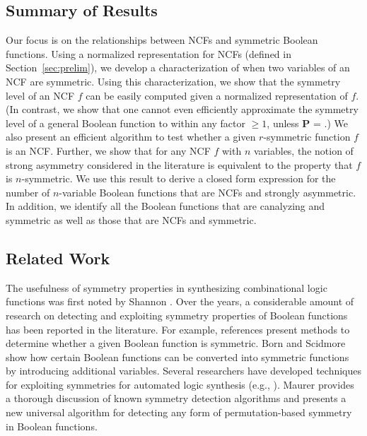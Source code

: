 
\subsection{Summary of Results}
\label{sse:contrib}

Our focus is on the relationships between 
NCFs and symmetric Boolean functions.
Using a normalized representation for NCFs 
(defined in Section~\ref{sec:prelim}), we develop a
characterization of when two variables of an NCF are symmetric.
Using this characterization, we show
that the symmetry level of an NCF $f$
can be easily computed given a normalized representation of $f$.
(In contrast, we show that 
one cannot even efficiently approximate the symmetry level of
a general Boolean function to within any factor $\geq 1$, 
unless \textbf{P} = \cnp.)
We also present an efficient algorithm to test whether a given
$r$-symmetric function $f$ is an NCF. 
Further, we show that for any NCF $f$ with $n$ variables, the notion of
strong asymmetry considered in the literature is equivalent to
the property that $f$ is $n$-symmetric.
We use this result to derive a closed form expression for the
number of $n$-variable Boolean functions
that are NCFs and strongly asymmetric.
In addition, we identify all the Boolean functions that are 
canalyzing and symmetric as well as those that 
are NCFs and symmetric.

\subsection{Related Work}
\label{sse:related}

The usefulness of symmetry properties in synthesizing 
combinational logic functions was first noted 
by Shannon \cite{Shannon-1938}.
Over the years, a considerable amount of research on detecting 
and exploiting symmetry properties 
of Boolean functions has been reported in the literature.
For example, references \cite{Biswas-1970,TM-1996} present methods 
to determine whether a given Boolean function is symmetric.
Born and Scidmore \cite{BS-1968} show how certain Boolean functions
can be converted into symmetric functions by introducing additional
variables. 
Several researchers have developed techniques for exploiting symmetries
for automated logic synthesis 
(e.g., \cite{AP-2008,Hu-etal-2008,KS-2000,Darga-etal-2008}).
Maurer \cite{Maurer-2015} provides a thorough discussion of known
symmetry detection algorithms and presents a new universal algorithm 
for detecting any form of permutation-based symmetry in Boolean functions. 

